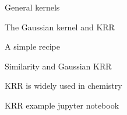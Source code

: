 \begin{frame}[t]{General kernels}

\end{frame}
\begin{frame}[t]{The Gaussian kernel and KRR}

\end{frame}
\begin{frame}[t]{A simple recipe}

\end{frame}
\begin{frame}[t]{Similarity and Gaussian KRR}

\end{frame}
\begin{frame}{KRR is widely used in chemistry}

\end{frame}
\begin{frame}{KRR example}
jupyter notebook
\end{frame}
